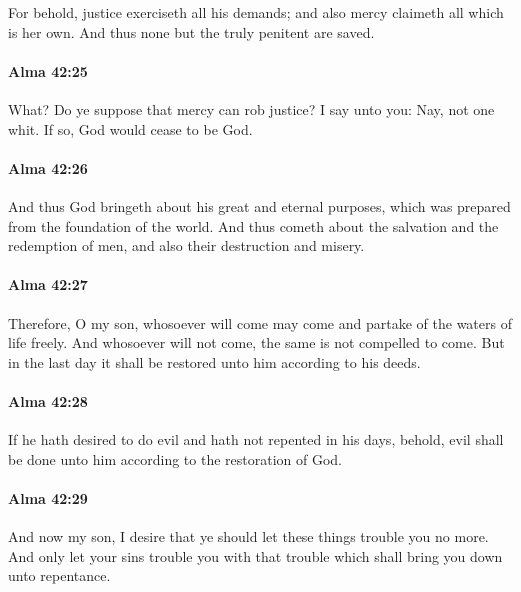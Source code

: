 			For behold, justice exerciseth all his demands;
			and also mercy claimeth all which is her own.
			And thus none but the truly penitent are saved.

		\paragraph{Alma 42:25} %
			\label{ALMA-42-25}

			What? Do ye suppose that mercy can rob justice?
			I say unto you:
			Nay, not one whit.
			If so, God would cease to be God.

		\paragraph{Alma 42:26} %
			\label{ALMA-42-26}

			And thus God bringeth about his great and eternal purposes,
			which was prepared from the foundation of the world.
			And thus cometh about the salvation and the redemption of men,
			and also their destruction and misery.

		\paragraph{Alma 42:27} %
			\label{ALMA-42-27}

			Therefore, O my son, whosoever will come
			may come and partake of the waters of life freely.
			And whosoever will not come,
			the same is not compelled to come.
			But in the last day it shall be restored unto him according to his deeds.

		\paragraph{Alma 42:28} %
			\label{ALMA-42-28}

			If he hath desired to do evil and hath not repented in his days,
			behold, evil shall be done unto him according to the restoration of God.

		\paragraph{Alma 42:29} %
			\label{ALMA-42-29}

			And now my son, I desire that ye should let these things trouble you no more.
			And only let your sins trouble you with that trouble
			which shall bring you down unto repentance.

